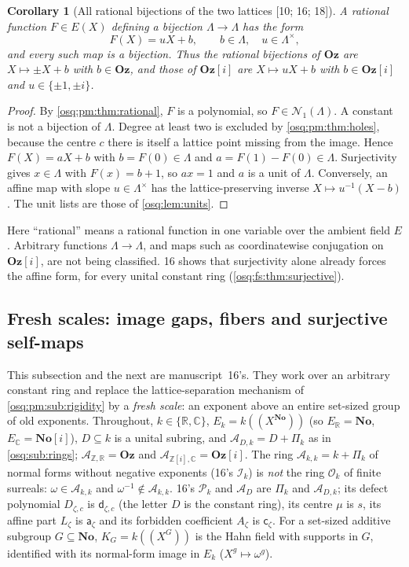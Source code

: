 \documentclass[11pt,letterpaper]{article}
\numberwithin{equation}{section}
\newtheorem{corollary}[corollary]{Corollary}
\theoremstyle{definition}
\theoremstyle{remark}
\theoremstyle{plain}
\newcommand{\No}{\mathbf{No}}
\newcommand{\Oz}{\mathbf{Oz}}
\newcommand{\SC}{\No[i]}
\newcommand{\GOz}{\Oz[i]}
\newcommand{\Z}{\mathbb Z}
\newcommand{\R}{\mathbb R}
\newcommand{\C}{\mathbb C}
\newcommand{\A}{\mathcal A}          %
\newcommand{\OO}{\mathcal O}         %
\newcommand{\hahn}[2]{#1(\!(X^{#2})\!)}
\newcommand{\Num}{\mathscr N}
\newcommand{\src}[1]{\textup{\textsf{[#1]}}}
\begin{document}
\begin{corollary}[All rational bijections of the two lattices \src{10; 16; 18}]
\label{osq:pm:cor:bijections}
A rational function $F\in E(X)$ defining a bijection $\Lambda\to\Lambda$ has the form
\[
 F(X)=uX+b,\qquad b\in\Lambda,\quad u\in\Lambda^\times,
\]
and every such map is a bijection. Thus the rational bijections of $\Oz$ are
$X\mapsto\pm X+b$ with $b\in\Oz$, and those of $\GOz$ are $X\mapsto uX+b$ with
$b\in\GOz$ and $u\in\{\pm1,\pm i\}$.
\end{corollary}
\begin{proof}
By \cref{osq:pm:thm:rational}, $F$ is a polynomial, so $F\in\Num_1(\Lambda)$. A constant is
not a bijection of $\Lambda$. Degree at least two is excluded by \cref{osq:pm:thm:holes},
because the centre $c$ there is itself a lattice point missing from the image. Hence
$F(X)=aX+b$ with $b=F(0)\in\Lambda$ and $a=F(1)-F(0)\in\Lambda$. Surjectivity gives
$x\in\Lambda$ with $F(x)=b+1$, so $ax=1$ and $a$ is a unit of $\Lambda$. Conversely, an
affine map with slope $u\in\Lambda^\times$ has the lattice-preserving inverse
$X\mapsto u^{-1}(X-b)$. The unit lists are those of \cref{osq:lem:units}.
\end{proof}

Here ``rational'' means a rational function in one variable over the ambient field $E$.
Arbitrary functions $\Lambda\to\Lambda$, and maps such as coordinatewise conjugation on
$\GOz$, are not being classified. 16 shows that surjectivity alone already forces the affine form, for
every unital constant ring (\cref{osq:fs:thm:surjective}).

\subsection{Fresh scales: image gaps, fibers and surjective self-maps}\label{osq:fs:sub:gaps}

This subsection and the next are manuscript~16's. They work over an arbitrary constant ring and replace the
lattice-separation mechanism of \cref{osq:pm:sub:rigidity} by a \emph{fresh scale}: an exponent above an entire
set-sized group of old exponents. Throughout, $k\in\{\R,\C\}$, $E_k=\hahn k\No$ (so $E_\R=\No$, $E_\C=\SC$), $D\subseteq k$ is a unital
subring, and $\A_{D,k}=D+\Pi_k$ as in \cref{osq:sub:rings}; $\A_{\Z,\R}=\Oz$ and $\A_{\Z[i],\C}=\GOz$. The ring $\A_{k,k}=k+\Pi_k$ of normal
forms without negative exponents (16's $\mathcal I_k$) is \emph{not} the ring $\OO_k$ of finite surreals: $\omega\in\A_{k,k}$ and
$\omega^{-1}\notin\A_{k,k}$. 16's $\mathcal P_k$ and $\mathcal A_D$ are $\Pi_k$ and $\A_{D,k}$; its defect polynomial $D_{\zeta,c}$ is
$\mathsf d_{\zeta,c}$ (the letter $D$ is the constant ring), its centre $\mu$ is $s$, its affine part $L_\zeta$ is $\mathsf a_\zeta$ and its
forbidden coefficient $A_\zeta$ is $\mathsf c_\zeta$. For a set-sized additive subgroup $G\subseteq\No$, $K_G=\hahn kG$ is the Hahn field
with supports in $G$, identified with its normal-form image in $E_k$ ($X^g\mapsto\omega^g$).
\end{document}
